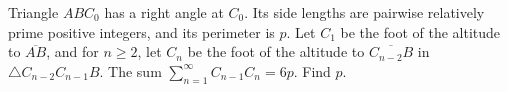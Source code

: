 Triangle $ABC_0$ has a right angle at $C_0$. Its side lengths are pairwise relatively prime positive integers, and its perimeter is $p$. Let $C_1$ be the foot of the altitude to $\overline{AB}$, and for $n\geq 2$, let $C_n$ be the foot of the altitude to $\overline{C_{n-2}B}$ in $\triangle C_{n-2}C_{n-1}B$. The sum $\sum\limits_{n=1}^{\infty}C_{n-1}C_n = 6p$. Find $p$.